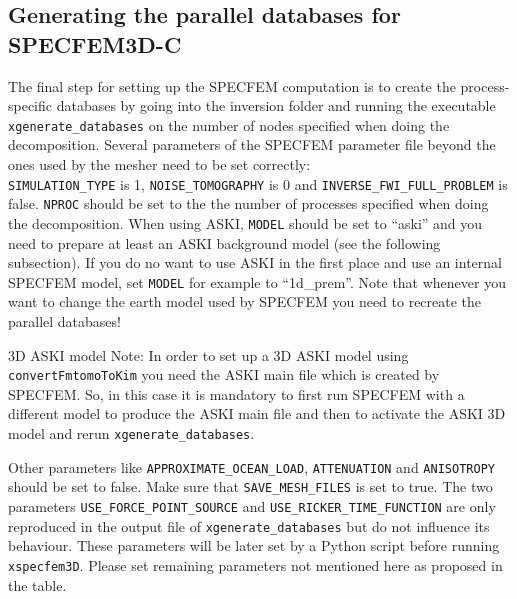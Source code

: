 \subsection{Generating the parallel databases for SPECFEM3D-C}
%
The final step for setting up the SPECFEM computation is to create the process-specific databases by going into the inversion folder and running the executable \verb+xgenerate_databases+ on the number of nodes specified when doing the decomposition. Several parameters of the SPECFEM parameter file beyond the ones used by the mesher need to be set correctly:\\ \verb+SIMULATION_TYPE+ is 1, \verb+NOISE_TOMOGRAPHY+ is 0 and \verb+INVERSE_FWI_FULL_PROBLEM+ is false. \verb+NPROC+ should be set to the the number of processes specified when doing the decomposition. When using ASKI, \verb+MODEL+ should be set to ``aski'' and you need to prepare at least an ASKI background model (see the following subsection). If you do no want to use ASKI in the first place and use an internal SPECFEM model, set \verb+MODEL+ for example to ``1d\_prem''.  Note that whenever you want to change the earth model used by SPECFEM you need to recreate the parallel databases!

\begin{infobox}[label={info:3d-aski-model},float=h!]{3D ASKI model}
 Note: In order to set up a 3D ASKI model using \verb+convertFmtomoToKim+ you need the ASKI main file which is created by SPECFEM. So, in this case it is mandatory to first run SPECFEM with a different model to produce the ASKI main file and then to activate the ASKI 3D model and rerun \verb+xgenerate_databases+.
\end{infobox}

 Other parameters like \verb+APPROXIMATE_OCEAN_LOAD+, \verb+ATTENUATION+ and \verb+ANISOTROPY+ should be set to false. Make sure that \verb+SAVE_MESH_FILES+ is set to true. The two parameters \verb+USE_FORCE_POINT_SOURCE+ and \verb+USE_RICKER_TIME_FUNCTION+ are only reproduced in the output file of \verb+xgenerate_databases+ but do not influence its behaviour. These parameters will be later set by a Python script before running \verb+xspecfem3D+. Please set remaining parameters not mentioned here as proposed in the table.

